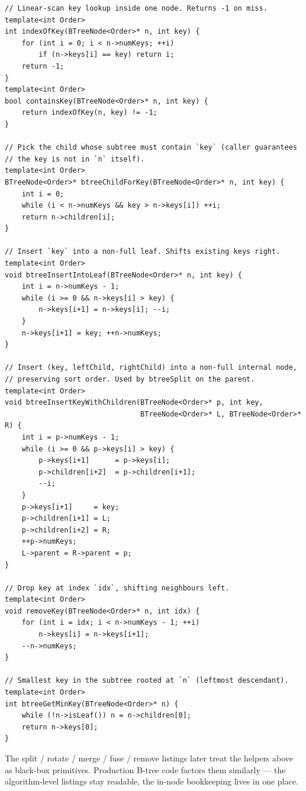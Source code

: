 \documentclass[11pt]{article}
\begin{document}
\begin{lstlisting}[basicstyle=\ttfamily\small,frame=single]
// Linear-scan key lookup inside one node. Returns -1 on miss.
template<int Order>
int indexOfKey(BTreeNode<Order>* n, int key) {
    for (int i = 0; i < n->numKeys; ++i)
        if (n->keys[i] == key) return i;
    return -1;
}
template<int Order>
bool containsKey(BTreeNode<Order>* n, int key) {
    return indexOfKey(n, key) != -1;
}

// Pick the child whose subtree must contain `key` (caller guarantees
// the key is not in `n` itself).
template<int Order>
BTreeNode<Order>* btreeChildForKey(BTreeNode<Order>* n, int key) {
    int i = 0;
    while (i < n->numKeys && key > n->keys[i]) ++i;
    return n->children[i];
}

// Insert `key` into a non-full leaf. Shifts existing keys right.
template<int Order>
void btreeInsertIntoLeaf(BTreeNode<Order>* n, int key) {
    int i = n->numKeys - 1;
    while (i >= 0 && n->keys[i] > key) {
        n->keys[i+1] = n->keys[i]; --i;
    }
    n->keys[i+1] = key; ++n->numKeys;
}

// Insert (key, leftChild, rightChild) into a non-full internal node,
// preserving sort order. Used by btreeSplit on the parent.
template<int Order>
void btreeInsertKeyWithChildren(BTreeNode<Order>* p, int key,
                                BTreeNode<Order>* L, BTreeNode<Order>* R) {
    int i = p->numKeys - 1;
    while (i >= 0 && p->keys[i] > key) {
        p->keys[i+1]      = p->keys[i];
        p->children[i+2]  = p->children[i+1];
        --i;
    }
    p->keys[i+1]     = key;
    p->children[i+1] = L;
    p->children[i+2] = R;
    ++p->numKeys;
    L->parent = R->parent = p;
}

// Drop key at index `idx`, shifting neighbours left.
template<int Order>
void removeKey(BTreeNode<Order>* n, int idx) {
    for (int i = idx; i < n->numKeys - 1; ++i)
        n->keys[i] = n->keys[i+1];
    --n->numKeys;
}

// Smallest key in the subtree rooted at `n` (leftmost descendant).
template<int Order>
int btreeGetMinKey(BTreeNode<Order>* n) {
    while (!n->isLeaf()) n = n->children[0];
    return n->keys[0];
}
\end{lstlisting}

\noindent The split / rotate / merge / fuse / remove listings later
treat the helpers above as black-box primitives. Production B-tree
code factors them similarly --- the algorithm-level listings stay
readable, the in-node bookkeeping lives in one place.
\end{document}
